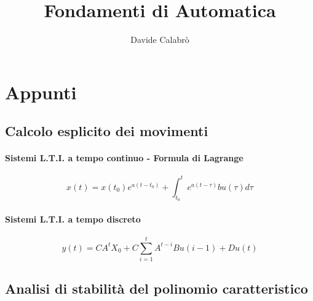 \documentclass{article}
\title{Fondamenti di Automatica}
\author{Davide Calabrò}
\begin{document}
	\maketitle
	
	\newpage
	\section*{Appunti}
	\subsection{Calcolo esplicito dei movimenti}
	\paragraph{Sistemi L.T.I. a tempo continuo - Formula di Lagrange}
	\begin{equation}
		x(t) = x(t_0)e^{a(t-t_0)} + \int_{t_0}^t e^{a(t-\tau)} b u(\tau) d\tau
	\end{equation}
	\paragraph{Sistemi L.T.I. a tempo discreto}
	\begin{equation}
		y(t) = CA^tX_0 + C \sum_{i=1}^{t} A^{t-i} Bu(i-1) + Du(t)
	\end{equation}
	
	\subsection{Analisi di stabilità del polinomio caratteristico}
\end{document}
